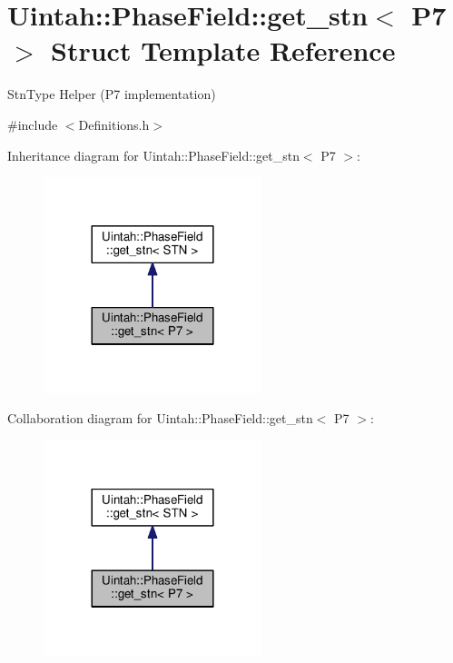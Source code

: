 \hypertarget{structUintah_1_1PhaseField_1_1get__stn_3_01P7_01_4}{}\section{Uintah\+:\+:Phase\+Field\+:\+:get\+\_\+stn$<$ P7 $>$ Struct Template Reference}
\label{structUintah_1_1PhaseField_1_1get__stn_3_01P7_01_4}


Stn\+Type Helper (P7 implementation)  




{\ttfamily \#include $<$Definitions.\+h$>$}



Inheritance diagram for Uintah\+:\+:Phase\+Field\+:\+:get\+\_\+stn$<$ P7 $>$\+:\nopagebreak
\begin{figure}[H]
\begin{center}
\leavevmode
\includegraphics[width=180pt]{structUintah_1_1PhaseField_1_1get__stn_3_01P7_01_4__inherit__graph}
\end{center}
\end{figure}


Collaboration diagram for Uintah\+:\+:Phase\+Field\+:\+:get\+\_\+stn$<$ P7 $>$\+:\nopagebreak
\begin{figure}[H]
\begin{center}
\leavevmode
\includegraphics[width=180pt]{structUintah_1_1PhaseField_1_1get__stn_3_01P7_01_4__coll__graph}
\end{center}
\end{figure}
